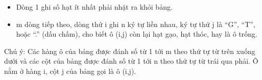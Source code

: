 \begin{itemize}
	\item     Dòng 1 ghi số hạt ít nhất phải nhặt ra khỏi bảng.   
	\item     m dòng tiếp theo, dòng thứ i ghi n ký tự liền nhau, ký tự thứ j là “G”, “T”, hoặc “.” (dấu chấm), cho biết ô (i,j) còn lại hạt gạo, hạt thóc, hay là ô trống.   
\end{itemize}

   Chú ý: Các hàng ô của bảng được đánh số từ 1 tới m theo thứ tự từ trên xuống dưới và các cột của bảng được đánh số từ 1 tới n theo thứ tự từ trái qua phải. Ô nằm ở hàng i, cột j của bảng gọi là ô (i,j).